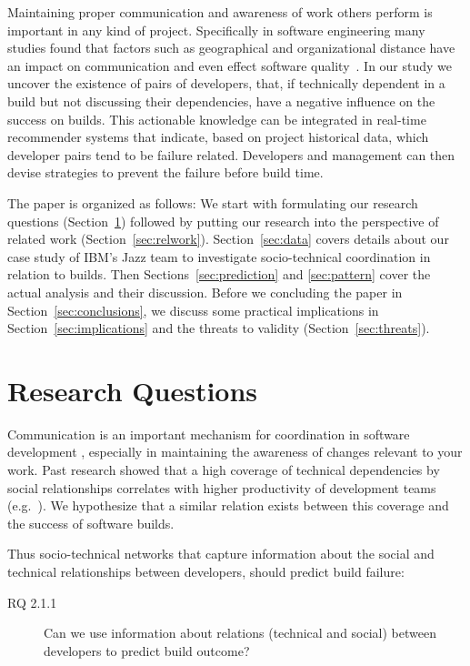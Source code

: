 Maintaining proper communication and awareness of work others perform is
important in any kind of project. Specifically in software engineering many studies found
that factors such as geographical and organizational distance have an impact on
communication and even effect software quality~\cite{nagappan:icse:2008}. In our
study we uncover the existence of pairs of
developers, that, if technically dependent in a build but not discussing their
dependencies, have a negative influence on the success on builds. This
actionable knowledge can be integrated in real-time recommender systems that
indicate, based on project historical data, which developer pairs tend to be
failure related. Developers and management can then devise strategies to
prevent the failure before build time. 


The paper is organized as follows: We start with formulating our research
questions (Section~\ref{sec:rq}) followed by putting our research into the
perspective of related work (Section~\ref{sec:relwork}). Section~\ref{sec:data}
covers details about our case study of IBM's Jazz team to investigate
socio-technical coordination in relation to builds. Then
Sections~\ref{sec:prediction} and \ref{sec:pattern} cover the actual analysis and
their discussion. Before we concluding the paper in
Section~\ref{sec:conclusions}, we discuss some practical implications in Section~\ref{sec:implications} and the threats to validity
(Section~\ref{sec:threats}).


\section{Research Questions}
\label{sec:rq}
Communication
is an important mechanism for coordination in software development \cite{curtis:acm:1988,kraut:1995coordination}, especially in maintaining the awareness of changes relevant to your work. Past research showed that a high coverage of technical
dependencies by social relationships correlates with higher productivity of development teams (e.g.~\cite{cataldo:cscw:2006}). 
 We hypothesize that a similar relation
exists between this coverage and the success of software builds. 

Thus
socio-technical networks that capture information about the social and technical
relationships between developers, should predict build failure:

\begin{description}
\item[RQ 2.1.1] Can we use information about relations (technical and social) between
developers to predict build outcome?
\end{description}

